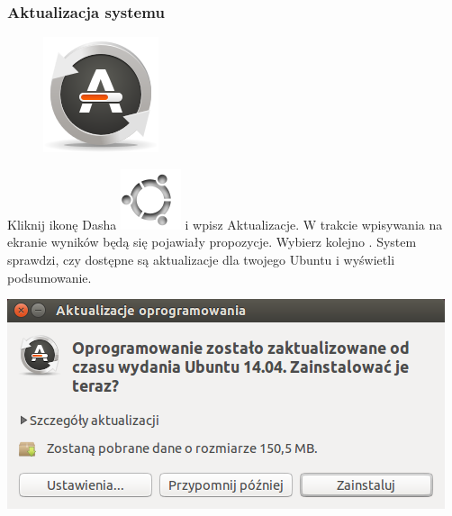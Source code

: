 \label{rzeczy_do_zrobienia_po_instalacji}
\subsubsection{Aktualizacja systemu}
\begin{figure}
	\vspace{-10pt}
	\includegraphics[width=\linewidth]{images/pierwsze_uruchomienie_aktualizacja1.png}
\end{figure}

Kliknij ikonę Dasha \includegraphics[scale=0.35]{images/ikony_dash.png} i wpisz \textcolor{ubuntu_orange}{Aktualizacje}. W trakcie wpisywania na ekranie wyników będą się pojawiały propozycje. Wybierz kolejno .
System sprawdzi, czy dostępne są aktualizacje dla twojego Ubuntu i wyświetli podsumowanie.

\begin{center}
	\includegraphics{images/pierwsze_uruchomienie_aktualizacja2.png}
\end{center}

